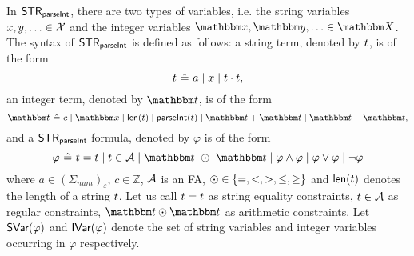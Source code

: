 

In ${\sf STR}_{\textsf{parseInt}}$, there are two types of variables, i.e. the string variables $x,y,\ldots \in \mathcal{X}$ and the integer variables $\ivarx,\ivary,\ldots \in \ivars$.
The syntax of ${\sf STR}_{\textsf{parseInt}}$ is defined as follows:
a string term, denoted by $t$, is of the form 
$$t\  \hat{=}\  a \mid x \mid t \cdot t,$$
an integer term, denoted by $\iterm$, is of the form
$$\iterm\  \Def\  c \mid \ivarx \mid \len(\sterm) \mid \parseInt(\sterm) \mid \iterm + \iterm \mid \iterm - \iterm,$$
and a ${\sf STR}_{\textsf{parseInt}}$ formula, denoted by $\varphi$ is of the form 
$$\varphi\ \Def\ \sterm = \sterm \mid \sterm \in \Aut \mid \iterm\ \op\ \iterm \mid \varphi \wedge \varphi \mid \varphi \vee \varphi \mid \neg \varphi$$
where $a \in (\Sigma_{\textit{num}})_\varepsilon$, $c \in \mathbb Z$, $\mathcal{A}$ is an FA, $\odot \in \{=, < , >, \le, \ge\}$ and $\textsf{len}(t)$ denotes the length of a string $t$. 
Let us call $t = t$ as string equality constraints, $t \in \mathcal{A}$ as regular constraints, $\iterm \op \iterm$ as arithmetic constraints. 
Let  $\textsf{SVar}(\varphi)$ and $\textsf{IVar}(\varphi)$ denote the set of string variables and integer variables occurring in $\varphi$ respectively.

